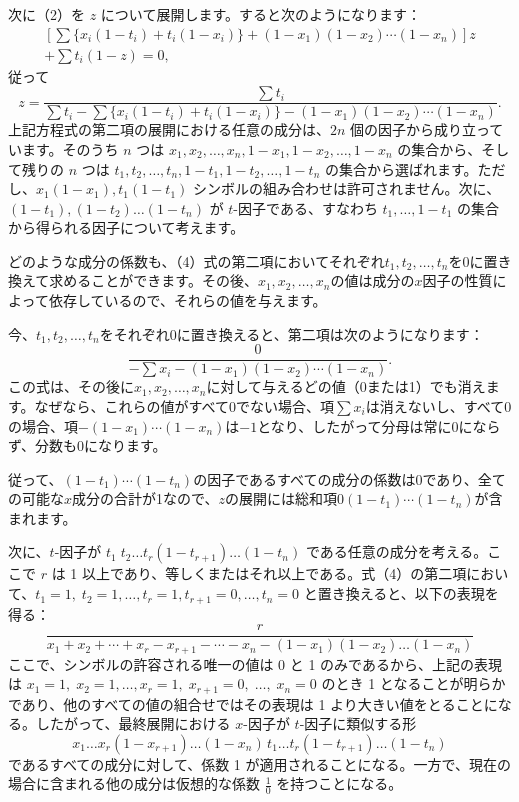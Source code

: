 \documentclass[a4paper,11pt,openany]{ltjsbook}
\begin{document}
次に（2）を $z$ について展開します。すると次のようになります：
\begin{multline*}
\left[ \sum \{ x_i (1 - t_i) + t_i (1 - x_i) \} + (1 - x_1)(1 - x_2) \cdots (1 - x_n) \right] z \\
+ \sum t_i(1 - z) = 0,
\end{multline*}
従って
\[
z = \frac{\sum t_i}{\sum t_i - \sum \{ x_i (1 - t_i) + t_i (1 - x_i) \} - (1 - x_1)(1 - x_2) \cdots (1 - x_n)}.   \tag{4}
\]
上記方程式の第二項の展開における任意の成分は、$2n$ 個の因子から成り立っています。そのうち $n$ つは $x_1, x_2, \dotsc, x_n, 1 - x_1, 1 - x_2, \dotsc, 1 - x_n$ の集合から、そして残りの $n$ つは $t_1, t_2, \dotsc, t_n, 1 - t_1, 1 - t_2, \dotsc, 1 - t_n$ の集合から選ばれます。ただし、$x_1(1 - x_1), t_1(1 - t_1)$ シンボルの組み合わせは許可されません。次に、$(1 - t_1), (1 - t_2) \dotsc (1 - t_n)$ が $t$-因子である、すなわち $t_1, \dotsc, 1 - t_1$ の集合から得られる因子について考えます。

どのような成分の係数も、（4）式の第二項においてそれぞれ$t_1, t_2, \dots, t_n$を$0$に置き換えて求めることができます。その後、$x_1, x_2, \dots, x_n$の値は成分の$x$因子の性質によって依存しているので、それらの値を与えます。

今、$t_1, t_2, \dots, t_n$をそれぞれ$0$に置き換えると、第二項は次のようになります：
\[
  \frac{0}{ -\sum x_i - (1-x_1)(1-x_2) \dotsm (1-x_n) }.
\]
この式は、その後に$x_1, x_2, \dots, x_n$に対して与えるどの値（0または1）でも消えます。なぜなら、これらの値がすべて0でない場合、項$\sum x_i$は消えないし、すべて0の場合、項$-(1-x_1) \dotsm (1-x_n)$は$-1$となり、したがって分母は常に0にならず、分数も0になります。

従って、$(1-t_1) \dotsm (1-t_n)$の因子であるすべての成分の係数は0であり、全ての可能な$x$成分の合計が1なので、$z$の展開には総和項$0(1-t_1)\dotsm (1-t_n)$が含まれます。

次に、$t$-因子が $t_1\; t_2 \dotsc t_r(1-t_{r+1}) \dotsc (1-t_n)$ である任意の成分を考える。ここで $r$ は 1 以上であり、等しくまたはそれ以上である。式（4）の第二項において、$t_1 = 1,\; t_2 = 1, \dotsc, t_r = 1, t_{r+1} = 0, \dotsc, t_n = 0$ と置き換えると、以下の表現を得る：
\[
  \frac{r}{x_1 + x_2 + \dotsb + x_r - x_{r+1} - \dotsb - x_n
           - (1-x_1)(1-x_2) \dotsc (1-x_n)}
\]
ここで、シンボルの許容される唯一の値は 0 と 1 のみであるから、上記の表現は $x_1 = 1,\; x_2 = 1, \dotsc, x_r = 1,\; x_{r+1} = 0,\; \dotsc,\; x_n = 0$ のとき 1 となることが明らかであり、他のすべての値の組合せではその表現は 1 より大きい値をとることになる。したがって、最終展開における $x$-因子が $t$-因子に類似する形
\[
  x_1 \dotsc x_r(1-x_{r+1}) \dotsc (1-x_n)\, t_1 \dotsc t_r(1-t_{r+1}) \dotsc (1-t_n)
\]
であるすべての成分に対して、係数 1 が適用されることになる。一方で、現在の場合に含まれる他の成分は仮想的な係数 $\frac{1}{0}$ を持つことになる。
\end{document}
